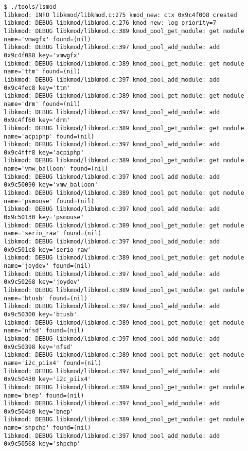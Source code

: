 \documentclass[11pt,a4paper]{article}
\begin{document}
{\begin{shaded}\begin{verbatim}
$ ./tools/lsmod 
libkmod: INFO libkmod/libkmod.c:275 kmod_new: ctx 0x9c4f008 created
libkmod: DEBUG libkmod/libkmod.c:276 kmod_new: log_priority=7
libkmod: DEBUG libkmod/libkmod.c:389 kmod_pool_get_module: get module name='vmwgfx' found=(nil)
libkmod: DEBUG libkmod/libkmod.c:397 kmod_pool_add_module: add 0x9c4f088 key='vmwgfx'
libkmod: DEBUG libkmod/libkmod.c:389 kmod_pool_get_module: get module name='ttm' found=(nil)
libkmod: DEBUG libkmod/libkmod.c:397 kmod_pool_add_module: add 0x9c4fec8 key='ttm'
libkmod: DEBUG libkmod/libkmod.c:389 kmod_pool_get_module: get module name='drm' found=(nil)
libkmod: DEBUG libkmod/libkmod.c:397 kmod_pool_add_module: add 0x9c4ff60 key='drm'
libkmod: DEBUG libkmod/libkmod.c:389 kmod_pool_get_module: get module name='acpiphp' found=(nil)
libkmod: DEBUG libkmod/libkmod.c:397 kmod_pool_add_module: add 0x9c4fff8 key='acpiphp'
libkmod: DEBUG libkmod/libkmod.c:389 kmod_pool_get_module: get module name='vmw_balloon' found=(nil)
libkmod: DEBUG libkmod/libkmod.c:397 kmod_pool_add_module: add 0x9c50090 key='vmw_balloon'
libkmod: DEBUG libkmod/libkmod.c:389 kmod_pool_get_module: get module name='psmouse' found=(nil)
libkmod: DEBUG libkmod/libkmod.c:397 kmod_pool_add_module: add 0x9c50130 key='psmouse'
libkmod: DEBUG libkmod/libkmod.c:389 kmod_pool_get_module: get module name='serio_raw' found=(nil)
libkmod: DEBUG libkmod/libkmod.c:397 kmod_pool_add_module: add 0x9c501c8 key='serio_raw'
libkmod: DEBUG libkmod/libkmod.c:389 kmod_pool_get_module: get module name='joydev' found=(nil)
libkmod: DEBUG libkmod/libkmod.c:397 kmod_pool_add_module: add 0x9c50268 key='joydev'
libkmod: DEBUG libkmod/libkmod.c:389 kmod_pool_get_module: get module name='btusb' found=(nil)
libkmod: DEBUG libkmod/libkmod.c:397 kmod_pool_add_module: add 0x9c50300 key='btusb'
libkmod: DEBUG libkmod/libkmod.c:389 kmod_pool_get_module: get module name='nfsd' found=(nil)
libkmod: DEBUG libkmod/libkmod.c:397 kmod_pool_add_module: add 0x9c50398 key='nfsd'
libkmod: DEBUG libkmod/libkmod.c:389 kmod_pool_get_module: get module name='i2c_piix4' found=(nil)
libkmod: DEBUG libkmod/libkmod.c:397 kmod_pool_add_module: add 0x9c50430 key='i2c_piix4'
libkmod: DEBUG libkmod/libkmod.c:389 kmod_pool_get_module: get module name='bnep' found=(nil)
libkmod: DEBUG libkmod/libkmod.c:397 kmod_pool_add_module: add 0x9c504d0 key='bnep'
libkmod: DEBUG libkmod/libkmod.c:389 kmod_pool_get_module: get module name='shpchp' found=(nil)
libkmod: DEBUG libkmod/libkmod.c:397 kmod_pool_add_module: add 0x9c50568 key='shpchp'

\end{verbatim}
\end{shaded}}
\end{document}

